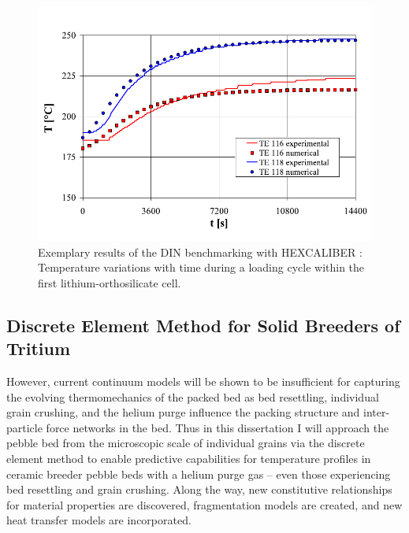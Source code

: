 \begin{figure}[t!]
    \centering
    \includegraphics[width=\singleimagewidth]{figures/Fig-9}
    \caption{Exemplary results of the DIN benchmarking with HEXCALIBER : Temperature variations with time during a loading cycle within the first lithium-orthosilicate cell\cite{DellOrco:2010zr}.}
    \label{fig:DIN_HEX}
\end{figure}





\subsection{Discrete Element Method for Solid Breeders of Tritium}
However, current continuum models will be shown to be insufficient for capturing the evolving thermomechanics of the packed bed as bed resettling, individual grain crushing, and the helium purge influence the packing structure and inter-particle force networks in the bed. Thus in this dissertation I will approach the pebble bed from the microscopic scale of individual grains via the discrete element method to enable predictive capabilities for temperature profiles in ceramic breeder pebble beds with a helium purge gas -- even those experiencing bed resettling and grain crushing. Along the way, new constitutive relationships for material properties are discovered, fragmentation models are created, and new heat transfer models are incorporated.



